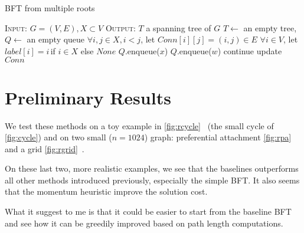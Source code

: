 \documentclass[a4paper,final,notitlepage,11pt,svgnames]{scrartcl}
\begin{document}
\begin{algorithm}
	\caption{BFT from multiple roots \label{alg:mbfs}}
	\begin{algorithmic}[1]
		\State \textsc{Input:} $G=(V, E), X \subset V$
		\State \textsc{Output:} $T$ a spanning tree of $G$
		\State $T \gets$ an empty tree, $Q \gets$ an empty queue
		\State $\forall i,j \in X, i<j$, let $Conn[i][j] = (i, j) \in E$
		\State $\forall i \in V$, let $label[i] = i \,$if $i\in X$ else $None$
			\State $Q$.enqueue($x$)
		\EndFor
					\State $Q$.enqueue($w$)
					\State continue
				\Else {}
					\State update $Conn$
				\EndIf
			\EndFor
		\EndWhile
	\end{algorithmic}
\end{algorithm}


\section*{Preliminary Results}

We test these methods on a toy example in
\autoref{fig:rcycle}~ (the small cycle of
\autoref{fig:cycle}) and on two small ($n=1024$) graph: preferential
attachment \autoref{fig:rpa}~ and a grid
\autoref{fig:rgrid}~. 

On these last two, more realistic examples, we see that the baselines
outperforms all other methods introduced previously, especially the simple
BFT. It also seems that the momentum heuristic improve the solution cost.

What it suggest to me is that it could be easier to start from the baseline BFT
and see how it can be greedily improved based on path length computations.
\end{document}
